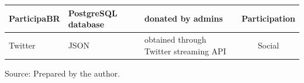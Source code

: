 \begin{table}[h!]
\begin{center}
\begin{tabular}{| l || p{3cm} | p{3cm} | c |}
																																																																																																																																																																																																																																																																																																																																																																																																																																											ParticipaBR & PostgreSQL database & donated by admins & Participation \\\hline
																																																																																																																																																																																																																																																																																																																																																																																																																																														Twitter & JSON & obtained through Twitter streaming API & Social \\\hline
																																																																																																																																																																																																																																																																																																																																																																																																																																																\end{tabular}
																																																																																																																																																																																																																																																																																																																																																																																																																																																		\begin{flushleft}
																																																																																																																																																																																																																																																																																																																																																																																																																																																					Source: Prepared by the author.\
																																																																																																																																																																																																																																																																																																																																																																																																																																																							\end{flushleft}

\end{center}
\end{table}
